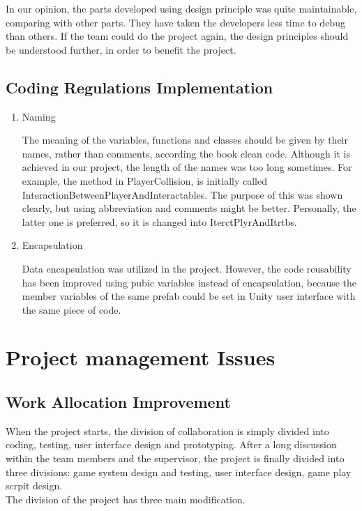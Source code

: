 \documentclass[12pt, a4paper]{report}
\begin{document}
			In our opinion, the parts developed using design principle was quite maintainable, comparing with other parts. They have taken the developers less time to debug than others. If the team could do the project again, the design principles should be understood further, in order to benefit the project.\\
				

			
			

		\subsection {Coding Regulations Implementation}	
			\begin{enumerate}
				\item Naming


				The meaning of the variables, functions and classes should be given by their names, rather than comments, according the book clean code. Although it is achieved in our project, the length of the names was too long sometimes. For example, the method in PlayerCollision, is initially called InteractionBetweenPlayerAndInteractables. The purpose of this was shown clearly, but using abbreviation and comments might be better. Personally, the latter one is preferred, so it is changed into IterctPlyrAndItrtbs.\\

				\item Encapsulation


				Data encapsulation was utilized in the project. However, the code reusability has been improved using pubic variables instead of encapsulation, because the member variables of the same prefab could be set in Unity user interface with the same piece of code.  
			\end{enumerate}
	\section{Project management Issues}
		\subsection {Work Allocation Improvement}


		When the project starts, the division of collaboration is simply divided into coding, testing, user interface design and prototyping. After a long discussion within the team members and the supervisor, the project is finally divided into three divisions: game system design and testing, user interface design, game play scrpit design. \\
		The division of the project has three main modification.\\
\end{document}
